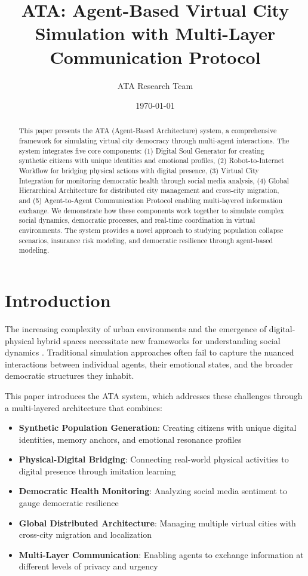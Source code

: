 \documentclass[12pt,a4paper]{article}
\title{\textbf{ATA: Agent-Based Virtual City Simulation with Multi-Layer Communication Protocol}}
\author{ATA Research Team}
\date{\today}
\begin{document}
\maketitle

\begin{abstract}
This paper presents the ATA (Agent-Based Architecture) system, a comprehensive framework for simulating virtual city democracy through multi-agent interactions. The system integrates five core components: (1) Digital Soul Generator for creating synthetic citizens with unique identities and emotional profiles, (2) Robot-to-Internet Workflow for bridging physical actions with digital presence, (3) Virtual City Integration for monitoring democratic health through social media analysis, (4) Global Hierarchical Architecture for distributed city management and cross-city migration, and (5) Agent-to-Agent Communication Protocol enabling multi-layered information exchange. We demonstrate how these components work together to simulate complex social dynamics, democratic processes, and real-time coordination in virtual environments. The system provides a novel approach to studying population collapse scenarios, insurance risk modeling, and democratic resilience through agent-based modeling.
\end{abstract}

\section{Introduction}

The increasing complexity of urban environments and the emergence of digital-physical hybrid spaces necessitate new frameworks for understanding social dynamics \citep{epstein1999growing}. Traditional simulation approaches often fail to capture the nuanced interactions between individual agents, their emotional states, and the broader democratic structures they inhabit.

This paper introduces the ATA system, which addresses these challenges through a multi-layered architecture that combines:
\begin{itemize}
    \item \textbf{Synthetic Population Generation}: Creating citizens with unique digital identities, memory anchors, and emotional resonance profiles
    \item \textbf{Physical-Digital Bridging}: Connecting real-world physical activities to digital presence through imitation learning
    \item \textbf{Democratic Health Monitoring}: Analyzing social media sentiment to gauge democratic resilience
    \item \textbf{Global Distributed Architecture}: Managing multiple virtual cities with cross-city migration and localization
    \item \textbf{Multi-Layer Communication}: Enabling agents to exchange information at different levels of privacy and urgency
\end{itemize}
\end{document}
